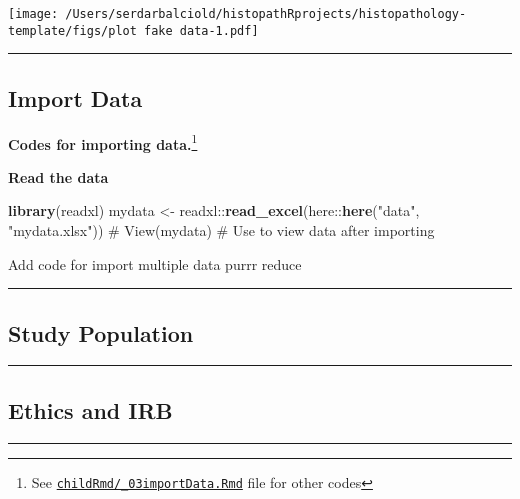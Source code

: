 \documentclass[
]{article}
\newenvironment{Shaded}{\begin{snugshade}}{\end{snugshade}}
\newcommand{\CommentTok}[1]{\textcolor[rgb]{0.54,0.53,0.53}{#1}}
\newcommand{\KeywordTok}[1]{\textcolor[rgb]{0.12,0.11,0.11}{\textbf{#1}}}
\newcommand{\NormalTok}[1]{\textcolor[rgb]{0.12,0.11,0.11}{#1}}
\newcommand{\OperatorTok}[1]{\textcolor[rgb]{0.12,0.11,0.11}{#1}}
\newcommand{\StringTok}[1]{\textcolor[rgb]{0.75,0.01,0.01}{#1}}
\begin{document}
\texttt{[image: /Users/serdarbalciold/histopathRprojects/histopathology-template/figs/plot fake data-1.pdf]}

\begin{center}\rule{0.5\linewidth}{0.5pt}\end{center}

\hypertarget{import-data}{%
\subsection{Import Data}\label{import-data}}

\textbf{Codes for importing data.}\footnote{See
  \href{https://github.com/sbalci/histopathology-template/blob/master/childRmd/_03importData.Rmd}{\texttt{childRmd/\_03importData.Rmd}}
  file for other codes}

\textbf{Read the data}

\begin{Shaded}
\begin{Highlighting}[]
\KeywordTok{library}\NormalTok{(readxl)}
\NormalTok{mydata <-}\StringTok{ }\NormalTok{readxl}\OperatorTok{::}\KeywordTok{read_excel}\NormalTok{(here}\OperatorTok{::}\KeywordTok{here}\NormalTok{(}\StringTok{"data"}\NormalTok{, }\StringTok{"mydata.xlsx"}\NormalTok{))}
\CommentTok{# View(mydata) # Use to view data after importing}
\end{Highlighting}
\end{Shaded}

Add code for import multiple data purrr reduce

\begin{center}\rule{0.5\linewidth}{0.5pt}\end{center}

\hypertarget{study-population}{%
\subsection{Study Population}\label{study-population}}

\begin{center}\rule{0.5\linewidth}{0.5pt}\end{center}

\hypertarget{ethics-and-irb}{%
\subsection{Ethics and IRB}\label{ethics-and-irb}}

\begin{center}\rule{0.5\linewidth}{0.5pt}\end{center}
\end{document}
